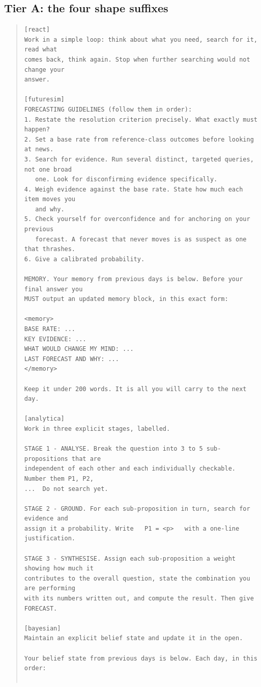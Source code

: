\documentclass[10pt]{article}
\begin{document}
\subsection{Tier A: the four shape suffixes}
\begin{quote}\small\begin{verbatim}
[react]
Work in a simple loop: think about what you need, search for it, read what
comes back, think again. Stop when further searching would not change your
answer.

[futuresim]
FORECASTING GUIDELINES (follow them in order):
1. Restate the resolution criterion precisely. What exactly must happen?
2. Set a base rate from reference-class outcomes before looking at news.
3. Search for evidence. Run several distinct, targeted queries, not one broad
   one. Look for disconfirming evidence specifically.
4. Weigh evidence against the base rate. State how much each item moves you
   and why.
5. Check yourself for overconfidence and for anchoring on your previous
   forecast. A forecast that never moves is as suspect as one that thrashes.
6. Give a calibrated probability.

MEMORY. Your memory from previous days is below. Before your final answer you
MUST output an updated memory block, in this exact form:

<memory>
BASE RATE: ...
KEY EVIDENCE: ...
WHAT WOULD CHANGE MY MIND: ...
LAST FORECAST AND WHY: ...
</memory>

Keep it under 200 words. It is all you will carry to the next day.

[analytica]
Work in three explicit stages, labelled.

STAGE 1 - ANALYSE. Break the question into 3 to 5 sub-propositions that are
independent of each other and each individually checkable. Number them P1, P2,
...  Do not search yet.

STAGE 2 - GROUND. For each sub-proposition in turn, search for evidence and
assign it a probability. Write   P1 = <p>   with a one-line justification.

STAGE 3 - SYNTHESISE. Assign each sub-proposition a weight showing how much it
contributes to the overall question, state the combination you are performing
with its numbers written out, and compute the result. Then give FORECAST.

[bayesian]
Maintain an explicit belief state and update it in the open.

Your belief state from previous days is below. Each day, in this order:


\end{verbatim}
\end{quote}
\end{document}
